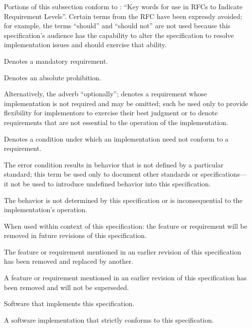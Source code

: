 %

Portions of this subsection conform to : ``Key words for use in RFCs
to Indicate Requirement Levels''. Certain terms from the RFC have been expressly
avoided; for example, the terms ``should'' and ``should not'' are not used
because this specification's audience has the capability to alter the
specification to resolve implementation issues and should exercise that ability.

\begin{description}
  Denotes a mandatory requirement.

  Denotes an absolute prohibition.

  Alternatively, the adverb ``optionally''; denotes a requirement whose
  implementation is not required and may be omitted; such \shall be used only to
  provide flexibility for implementors to exercise their best judgment or to
  denote requirements that are not essential to the operation of the
  implementation.

  Denotes a condition under which an implementation need not conform to a
  requirement.

  The error condition results in behavior that is not defined by a particular
  standard; this term \shall be used only to document other standards or
  specifications---it \shall not be used to introduce undefined behavior into
  this specification.

  The behavior is not determined by this specification or is inconsequential to
  the implementation's operation.

  When used within context of this specification: the feature or requirement
  will be removed in future revisions of this specification.

  The feature or requirement mentioned in an earlier revision of this
  specification has been removed and replaced by another.

  A feature or requirement mentioned in an earlier revision of this
  specification has been removed and will not be superseded.

  Software that implements this specification.

  A software implementation that strictly conforms to this specification.
\end{description}
